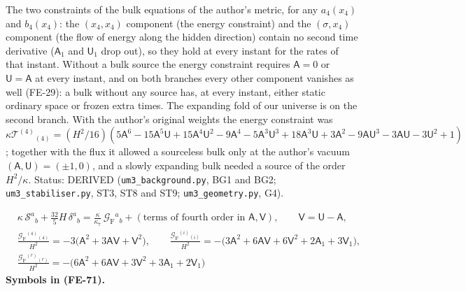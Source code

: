 \documentclass[
  10pt,
]{article}
\begin{document}
The two constraints of the bulk equations of the author's metric, for
any \(a_4(x_4)\) and \(b_4(x_4)\): the \((x_4, x_4)\) component (the
energy constraint) and the \((\sigma, x_4)\) component (the flow of
energy along the hidden direction) contain no second time derivative
(\(\mathsf{A}_1\) and \(\mathsf{U}_1\) drop out), so they hold at every
instant for the rates of that instant. Without a bulk source the energy
constraint requires \(\mathsf{A} = 0\) or \(\mathsf{U} = \mathsf{A}\) at
every instant, and on both branches every other component vanishes as
well (FE-29): a bulk without any source has, at every instant, either
static ordinary space or frozen extra times. The expanding fold of our
universe is on the second branch. With the author's original weights the
energy constraint was
\(\kappa\mathcal{T}^{(4)}{}_{(4)} = (H^2/16)(5\mathsf{A}^6 - 15\mathsf{A}^5\mathsf{U} + 15\mathsf{A}^4\mathsf{U}^2 - 9\mathsf{A}^4 - 5\mathsf{A}^3\mathsf{U}^3 + 18\mathsf{A}^3\mathsf{U} + 3\mathsf{A}^2 - 9\mathsf{A}\mathsf{U}^3 - 3\mathsf{A}\mathsf{U} - 3\mathsf{U}^2 + 1)\);
together with the flux it allowed a sourceless bulk only at the author's
vacuum \((\mathsf{A}, \mathsf{U}) = (\pm1, 0)\), and a slowly expanding
bulk needed a source of the order \(H^2/\kappa\). Status: DERIVED
(\texttt{um3\_background.py}, BG1 and BG2; \texttt{um3\_stabiliser.py},
ST3, ST8 and ST9; \texttt{um3\_geometry.py}, G4).

\[
\begin{aligned}
&\kappa\,\mathcal{S}^a{}_b + \frac{32}{5}H\,\delta^a{}_b = \frac{\kappa}{\kappa_7}\,\mathcal{G}_{\mathrm{F}}{}^a{}_b
 + (\text{terms of fourth order in } \mathsf{A}, \mathsf{V}),\qquad \mathsf{V} = \mathsf{U} - \mathsf{A},\\
&\frac{\mathcal{G}_{\mathrm{F}}{}^{(4)}{}_{(4)}}{H^2} = -3\big(\mathsf{A}^2 + 3\mathsf{A}\mathsf{V} + \mathsf{V}^2\big),\qquad
 \frac{\mathcal{G}_{\mathrm{F}}{}^{(i)}{}_{(i)}}{H^2} = -\big(3\mathsf{A}^2 + 6\mathsf{A}\mathsf{V} + 6\mathsf{V}^2 + 2\mathsf{A}_1 + 3\mathsf{V}_1\big),\\
&\frac{\mathcal{G}_{\mathrm{F}}{}^{(r)}{}_{(r)}}{H^2} = -\big(6\mathsf{A}^2 + 6\mathsf{A}\mathsf{V} + 3\mathsf{V}^2 + 3\mathsf{A}_1 + 2\mathsf{V}_1\big)
\end{aligned} \tag{FE-71}
\] \textbf{Symbols in (FE-71).}
\end{document}
